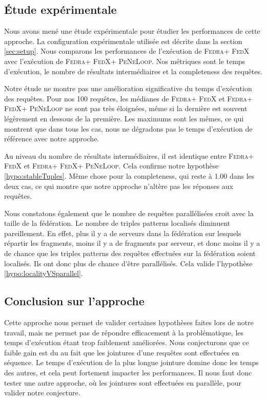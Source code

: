 \documentclass[a4paper]{article}
\def\fedra{\textsc{Fedra}\xspace}
\def\fedx{\textsc{FedX}\xspace}
\def\peneloop{\textsc{PeNeLoop}\xspace}
\begin{document}


\subsection{Étude expérimentale}\label{sec:expPBJ}

Nous avons mené une étude expérimentale pour étudier les performances de cette approche. La configuration expérimentale utilisée est décrite dans la section \ref{sec:setup}. Nous comparons les performances de l'exécution de \fedra + \fedx avec l'exécution de \fedra + \fedx + \peneloop. Nos métriques sont le temps d'exécution, le nombre de résultats intermédiaires et la completeness des requêtes.

Notre étude ne montre pas une amélioration significative du temps d'exécution des requêtes. Pour nos 100 requêtes, les médianes de \fedra + \fedx et \fedra + \fedx + \peneloop ne sont pas très éloignées, même si la dernière est souvent légèrement en dessous de la première. Les maximums sont les mêmes, ce qui montrent que dans tous les cas, nous ne dégradons pas le temps d'exécution de référence avec notre approche.

Au niveau du nombre de résultats intermédiaires, il est identique entre \fedra + \fedx et \fedra + \fedx + \peneloop. Cela confirme notre hypothèse \ref{hypo:stableTuples}. Même chose pour la completeness, qui reste à 1.00 dans les deux cas, ce qui montre que notre approche n'altère pas les réponses aux requêtes.

Nous constatons également que le nombre de requêtes parallélisées croit avec la taille de la fédération. Le nombre de triples patterns localisés diminuent pareillement. En effet, plus il y a de serveurs dans la fédération sur lesquels répartir les fragments, moins il y a de fragments par serveur, et donc moins il y a de chance que les triples patterns des requêtes effectuées sur la fédération soient localisés. Ils ont donc plus de chance d'être parallélisés. Cela valide l'hypothèse \ref{hypo:localityVSparallel}.

\subsection{Conclusion sur l'approche}

Cette approche nous permet de valider certaines hypothèses faites lors de notre travail, mais ne permet pas de répondre efficacement à la problématique, les temps d'exécution étant trop faiblement améliorées. Nous conjecturons que ce faible gain est du au fait que les jointures d'une requêtes sont effectuées en séquence. Le temps d'exécution de la plus longue jointure domine donc les temps des autres, et cela peut fortement impacter les performances. Il nous faut donc tester une autre approche, où les jointures sont effectuées en parallèle, pour valider notre conjecture.
\end{document}
